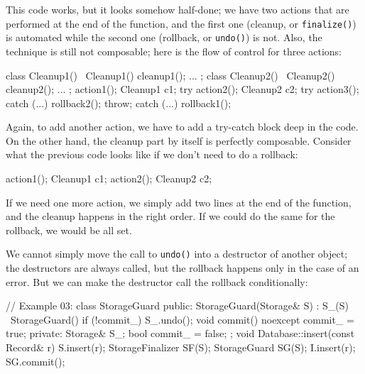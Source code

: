 This code works, but it looks somehow half-done; we have two actions that are performed at the end of the function, and the first one (cleanup, or \texttt{finalize()}) is automated while the second one (rollback, or \texttt{undo()}) is not. Also, the technique is still not composable; here is the flow of control for three actions:

\begin{code}
class Cleanup1() {
  ~Cleanup1() { cleanup1(); }
  ...
};
class Cleanup2() {
  ~Cleanup2() { cleanup2(); }
  ...
};
action1();
Cleanup1 c1;
try {
  action2();
  Cleanup2 c2;
  try {
    action3();
  } catch (...) {
    rollback2();
    throw;
  }
} catch (...) {
  rollback1();
}
\end{code}

Again, to add another action, we have to add a try-catch block deep in the code. On the other hand, the cleanup part by itself is perfectly composable. Consider what the previous code looks like if we don't need to do a rollback:

\begin{code}
action1();
Cleanup1 c1;
action2();
Cleanup2 c2;
\end{code}

If we need one more action, we simply add two lines at the end of the function, and the cleanup happens in the right order. If we could do the same for the rollback, we would be all set.

We cannot simply move the call to \texttt{undo()} into a destructor of another object; the destructors are always called, but the rollback happens only in the case of an error. But we can make the destructor call the rollback conditionally:

\begin{code}
// Example 03:
class StorageGuard {
  public:
  StorageGuard(Storage& S) : S_(S) {}
  ~StorageGuard() {
    if (!commit_) S_.undo();
  }
  void commit() noexcept { commit_ = true; }
  private:
  Storage& S_;
  bool commit_ = false;
};
void Database::insert(const Record& r) {
  S.insert(r);
  StorageFinalizer SF(S);
  StorageGuard SG(S);
  I.insert(r);
  SG.commit();
}
\end{code}

